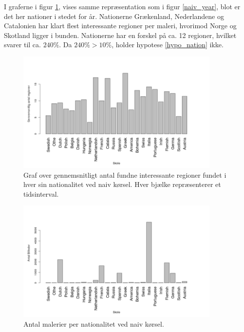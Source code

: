 {I graferne i figur \ref{naiv_nation}, vises samme repræsentation som
i figur \ref{naiv_year}, blot er det her nationer i stedet for år. Nationerne
Grækenland, Nederlandene og Catalonien har klart flest interessante
regioner per maleri, hvorimod Norge og Skotland ligger i bunden.
Nationerne har en forskel på ca. 12 regioner, hvilket svarer til ca.
$240\%$. Da $240 \% > 10 \%$, holder hypotese
\ref{hypo_nation} ikke.

\begin{figure}[!h]
	\centering
	\includegraphics[angle=0,width=0.90\textwidth]{afsnit/resultater/billeder/nationcut.png}
    \caption{Graf over gennemsnitligt antal fundne interessante regioner
    fundet i hver sin nationalitet ved naiv kørsel. Hver bjælke
    repræsenterer et tidsinterval.}
	\label{naiv_nation}
\end{figure}

\begin{figure}[!h]
	\centering
	\includegraphics[angle=0,width=0.90\textwidth]{afsnit/resultater/billeder/nationNrImage.png}
	\caption{Antal malerier per nationalitet ved naiv kørsel.}
	\label{naiv_nationNrImage}
\end{figure}

}
